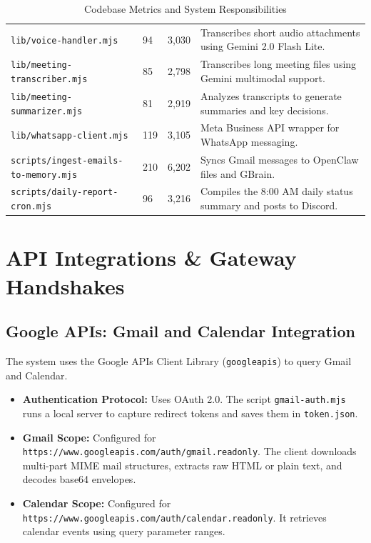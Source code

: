 \documentclass[12pt,a4paper]{report}
\begin{document}
\begin{table}[htbp]
\begin{tabular}{L{4cm} C{1.2cm} C{1.2cm} L{8cm}}
\texttt{lib/voice-handler.mjs} & 94 & 3,030 & Transcribes short audio attachments using Gemini 2.0 Flash Lite. \\
\texttt{lib/meeting-transcriber.mjs} & 85 & 2,798 & Transcribes long meeting files using Gemini multimodal support. \\
\texttt{lib/meeting-summarizer.mjs} & 81 & 2,919 & Analyzes transcripts to generate summaries and key decisions. \\
\texttt{lib/whatsapp-client.mjs} & 119 & 3,105 & Meta Business API wrapper for WhatsApp messaging. \\
\texttt{scripts/ingest-emails-to-memory.mjs} & 210 & 6,202 & Syncs Gmail messages to OpenClaw files and GBrain. \\
\texttt{scripts/daily-report-cron.mjs} & 96 & 3,216 & Compiles the 8:00 AM daily status summary and posts to Discord. \\
\bottomrule
\end{tabular}
\caption{Codebase Metrics and System Responsibilities}
\label{tab:file_metrics}
\end{table}

\chapter{API Integrations \& Gateway Handshakes}
\label{chap:api}

\section{Google APIs: Gmail and Calendar Integration}
The system uses the Google APIs Client Library (\texttt{googleapis}) to query Gmail and Calendar.
\begin{itemize}
    \item \textbf{Authentication Protocol:} Uses OAuth 2.0. The script \texttt{gmail-auth.mjs} runs a local server to capture redirect tokens and saves them in \texttt{token.json}.
    \item \textbf{Gmail Scope:} Configured for \texttt{https://www.googleapis.com/auth/gmail.readonly}. The client downloads multi-part MIME mail structures, extracts raw HTML or plain text, and decodes base64 envelopes.
    \item \textbf{Calendar Scope:} Configured for \texttt{https://www.googleapis.com/auth/calendar.readonly}. It retrieves calendar events using query parameter ranges.
\end{itemize}
\end{document}
